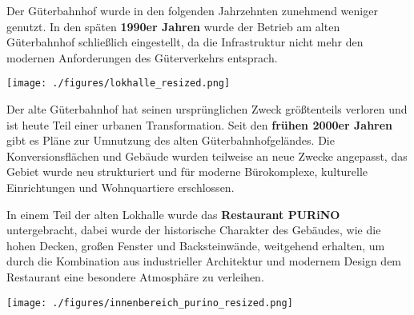 \documentclass[landscape, a4paper]{article}
\newcommand\alert[1]{\textcolor{PrimaryColor}{\textbf{#1}}}
\begin{document}
\hspace{0.4cm}
\begin{minipage}[t]{0.32\textwidth}
	\vspace{0cm}
	\setlength{\parskip}{0.25cm}
	Der Güterbahnhof wurde in den folgenden Jahrzehnten zunehmend weniger genutzt. In den späten \alert{1990er Jahren} wurde der Betrieb am alten Güterbahnhof schließlich eingestellt, da die Infrastruktur nicht mehr den modernen Anforderungen des Güterverkehrs entsprach.

	\texttt{[image: ./figures/lokhalle\_resized.png]}
	\setlength{\parskip}{0.25cm}

	Der alte Güterbahnhof hat seinen ursprünglichen Zweck größtenteils verloren und ist heute Teil einer urbanen Transformation. Seit den \alert{frühen 2000er Jahren} gibt es Pläne zur Umnutzung des alten Güterbahnhofgeländes. Die Konversionsflächen und Gebäude wurden teilweise an neue Zwecke angepasst, das Gebiet wurde neu strukturiert und für moderne Bürokomplexe, kulturelle Einrichtungen und Wohnquartiere erschlossen. %

  In einem Teil der alten Lokhalle wurde das \alert{Restaurant PURiNO} untergebracht, dabei wurde der historische Charakter des Gebäudes, wie die hohen Decken, großen Fenster und Backsteinwände, weitgehend erhalten, um durch die Kombination aus industrieller Architektur und modernem Design dem Restaurant eine besondere Atmosphäre zu verleihen.

	\texttt{[image: ./figures/innenbereich\_purino\_resized.png]}
	\setlength{\parskip}{0.25cm}

\end{minipage}
\newpage
\end{document}
